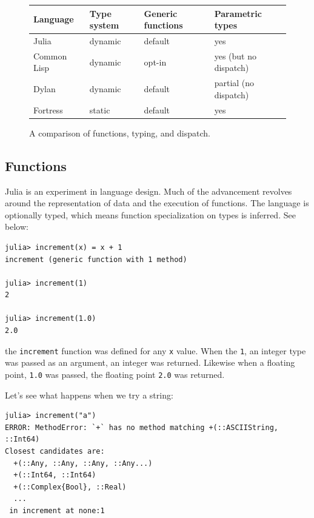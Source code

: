 \documentclass[a4paper]{article}
\begin{document}
\begin{figure}[h!]
  \centering
    \caption{A comparison of functions, typing, and dispatch.}
    \begin{tabular}{ l | l l l}
    Language & Type system & Generic functions & Parametric types \\
    \hline
    Julia & dynamic & default & yes \\
    Common Lisp & dynamic & opt-in & yes (but no dispatch) \\
    Dylan & dynamic & default & partial (no dispatch) \\
    Fortress & static & default & yes \\
    \end{tabular}
\end{figure}


\subsection{Functions}
Julia is an experiment in language design. Much of the advancement
revolves around the representation of data and the execution of functions.
The language is optionally typed, which means function specialization on types
is inferred. See below:
\begin{lstlisting}
julia> increment(x) = x + 1
increment (generic function with 1 method)

julia> increment(1)
2

julia> increment(1.0)
2.0
\end{lstlisting}
the \texttt{increment} function was defined for any \texttt{x} value. When the
\texttt{1}, an
integer type was passed as an argument, an integer was returned. Likewise
when a floating point, \texttt{1.0} was passed, the floating point
\texttt{2.0} was returned.

Let's see what happens when we try a string:
\begin{lstlisting}
julia> increment("a")
ERROR: MethodError: `+` has no method matching +(::ASCIIString, ::Int64)
Closest candidates are:
  +(::Any, ::Any, ::Any, ::Any...)
  +(::Int64, ::Int64)
  +(::Complex{Bool}, ::Real)
  ...
 in increment at none:1
\end{lstlisting}
\end{document}
